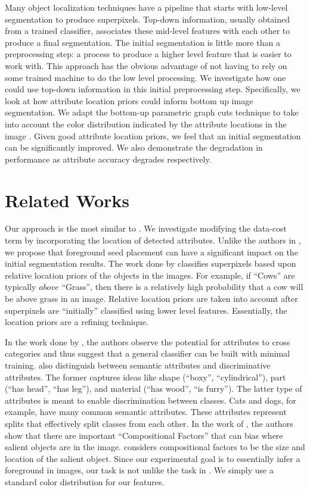 \documentclass[10pt,twocolumn,letterpaper]{article}
\begin{document}
Many object localization techniques have a pipeline that starts with low-level segmentation to produce superpixels.  Top-down information, usually obtained from a trained classifier, associates these mid-level features with each other to produce a final segmentation.  The initial segmentation is little more than a preprocessing step: a process to produce a higher level feature that is easier to work with.  This approach has the obvious advantage of not having to rely on some trained machine to do the low level processing.  We investigate how one could use top-down information in this initial preprocessing step.  Specifically, we look at how attribute location priors could inform bottom up image segmentation.  We adapt the bottom-up parametric graph cuts technique to take into account the color distribution indicated by the attribute locations in the image \cite{Boykov2001}.  Given good attribute location priors, we feel that an initial segmentation can be significantly improved.  We also demonstrate the degradation in performance as attribute accuracy degrades respectively.

\section{Related Works}
Our approach is the most similar to \cite{Carreira2010}.  We investigate modifying the data-cost term by incorporating the location of detected attributes.  Unlike the authors in \cite{Carreira2010}, we propose that foreground seed placement can have a significant impact on the initial segmentation results.  The work done by \cite{Gould2010} classifies superpixels based upon relative location priors of the objects in the images.  For example, if ``Cows'' are typically $above$ ``Grass'', then there is a relatively high probability that a cow will be above grass in an image.  Relative location priors are taken into account after superpixels are ``initially'' classified using lower level features.  Essentially, the location priors are a refining technique.

In the work done by \cite{Farhadi2009}, the authors observe the potential for attributes to cross categories and thus suggest that a general classifier can be built with minimal training.  \cite{Farhadi2009} also distinguish between semantic attributes and discriminative attributes.  The former captures ideas like shape (``boxy'', ``cylindrical''), part (``has head'', ``has leg''), and material (``has wood'', ``is furry'').  The latter type of attributes is meant to enable discrimination between classes.  Cats and dogs, for example, have many common semantic attributes.  These attributes represent splits that effectively split classes from each other.  In the work of \cite{Berg2012}, the authors show that there are important ``Compositional Factors'' that can bias where salient objects are in the image.  \cite{Berg2012} considers compositional factors to be the size and location of the salient object.  Since our experimental goal is to essentially infer a foreground in images, our task is not unlike the task in \cite{Berg2012}.  We simply use a standard color distribution for our features.
\end{document}
